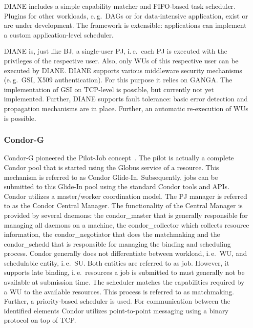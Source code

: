 \documentclass{sig-alternate}
\begin{document}
DIANE includes a simple capability matcher and FIFO-based task scheduler.
Plugins for other workloads, e.\,g.\ DAGs or for data-intensive
application, exist or are under development. The framework is extensible:
applications can implement a custom application-level scheduler.


DIANE is, just like BJ, a single-user PJ, i.\,e.\ each PJ is executed with the
privileges of the respective user. Also, only WUs of this respective user can be
executed by DIANE. DIANE supports various middleware security mechanisms
(e.\,g.\ GSI, X509 authentication). For this purpose it relies on GANGA. The
implementation of GSI on TCP-level is possible, but currently not yet
implemented. Further, DIANE supports fault tolerance: basic error detection and
propagation mechanisms are in place. Further, an automatic re-execution of WUs
is possible.

\subsubsection{Condor-G}
Condor-G pioneered the Pilot-Job concept~\cite{condor-g}. The pilot is
actually a complete Condor pool that is started using the Globus
service of a resource. This mechanism is referred to as Condor
Glide-In. Subsequently, jobs can be submitted to this Glide-In pool
using the standard Condor tools and APIs. Condor utilizes a
master/worker coordination model. The PJ manager is referred to as the
Condor Central Manager. The functionality of the Central Manager is
provided by several daemons: the condor\_master that is generally
responsible for managing all daemons on a machine, the
condor\_collector which collects resource information, the
condor\_negotiator that does the matchmaking and the condor\_schedd
that is responsible for managing the binding and scheduling
process. Condor generally does not differentiate between workload,
i.\,e.\ WU, and schedulable entity, i.\,e.\ SU. Both entities are
referred to as job. However, it supports late binding, i.\,e.\
resources a job is submitted to must generally not be available at
submission time. The scheduler matches the capabilities required by a
WU to the available resources. This process is referred to as
matchmaking. Further, a priority-based scheduler is used. For
communication between the identified elements Condor utilizes
point-to-point messaging using a binary protocol on top of TCP.
\end{document}
